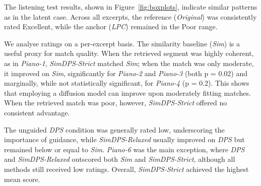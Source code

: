\documentclass{article}
\begin{document}

The listening test results,  shown in Figure~\ref{fig:boxplots}, indicate similar patterns as in the latent case. 
 Across all excerpts, the reference (\textit{Original}) was consistently rated Excellent, while the anchor (\textit{LPC}) remained in the Poor range.

 We analyse ratings on a per-excerpt basis.
The similarity baseline (\textit{Sim}) is a useful proxy for match quality. When the retrieved segment was highly coherent, as in \textit{Piano-1}, \textit{SimDPS-Strict} matched \textit{Sim}; when the match was only moderate, it improved on \textit{Sim}, significantly for \textit{Piano-2} and \textit{Piano-3} (both p = 0.02) and marginally, while not statistically significant, for \textit{Piano-4} (p = 0.2).
This shows that employing a diffusion model can improve upon moderately fitting matches.
When the retrieved match was poor, however, \textit{SimDPS-Strict} offered no consistent advantage.

The unguided \textit{DPS} condition was generally rated low, underscoring the importance of guidance, while \textit{SimDPS-Relaxed} usually improved on \textit{DPS} but remained below or equal to \textit{Sim}. \textit{Piano-6} was the main exception, where \textit{DPS} and \textit{SimDPS-Relaxed} outscored both \textit{Sim} and \textit{SimDPS-Strict}, although all methods still received low ratings. Overall, \textit{SimDPS-Strict} achieved the highest mean score.
\end{document}
